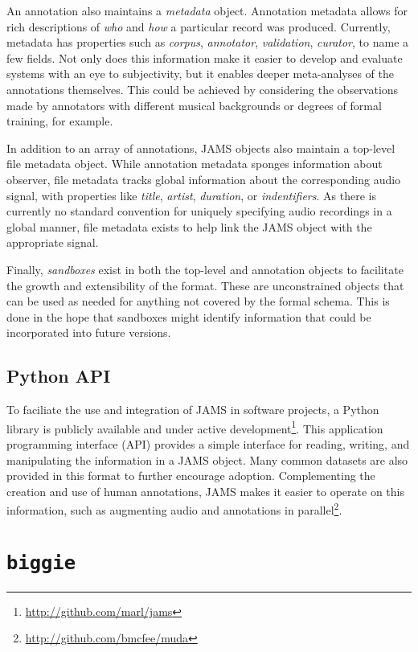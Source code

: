 An annotation also maintains a \emph{metadata} object.
Annotation metadata allows for rich descriptions of \emph{who} and \emph{how} a particular record was produced.
Currently, metadata has properties such as \emph{corpus}, \emph{annotator}, \emph{validation}, \emph{curator}, to name a few fields.
Not only does this information make it easier to develop and evaluate systems with an eye to subjectivity, but it enables deeper meta-analyses of the annotations themselves.
This could be achieved by considering the observations made by annotators with different musical backgrounds or degrees of formal training, for example.

In addition to an array of annotations, JAMS objects also maintain a top-level file metadata object.
While annotation metadata sponges information about observer, file metadata tracks global information about the corresponding audio signal, with properties like \emph{title}, \emph{artist}, \emph{duration}, or \emph{indentifiers}.
As there is currently no standard convention for uniquely specifying audio recordings in a global manner, file metadata exists to help link the JAMS object with the appropriate signal.

Finally, \emph{sandboxes} exist in both the top-level and annotation objects to facilitate the growth and extensibility of the format.
These are unconstrained objects that can be used as needed for anything not covered by the formal schema.
This is done in the hope that sandboxes might identify information that could be incorporated into future versions.


\subsection{Python API}
\label{subsec:jams_tools}

To faciliate the use and integration of JAMS in software projects, a Python library is publicly available and under active development\footnote{\url{http://github.com/marl/jams}}.
This application programming interface (API) provides a simple interface for reading, writing, and manipulating the information in a JAMS object.
Many common datasets are also provided in this format to further encourage adoption.
Complementing the creation and use of human annotations, JAMS makes it easier to operate on this information, such as augmenting audio and annotations in parallel\footnote{\url{http://github.com/bmcfee/muda}}.


\section{\texttt{biggie}}
\label{sec:biggie}


